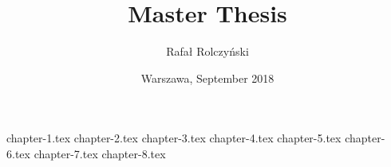 \documentclass{report}
\title{ \textbf{Master Thesis} }
\author{Rafał Rolczyński}
\date{Warszawa, September 2018}
\renewcommand{\baselinestretch}{1.5}
\begin{document}



\renewcommand{\baselinestretch}{1.2}\normalsize
\tableofcontents
\renewcommand{\baselinestretch}{1.5}\normalsize

\printglossary[type=\acronymtype]
\printglossary

{chapter-1.tex}
{chapter-2.tex}
{chapter-3.tex}
{chapter-4.tex}
{chapter-5.tex}
{chapter-6.tex}
{chapter-7.tex}
{chapter-8.tex}

\listoftables
\listoffigures
\printbibliography
\end{document}
